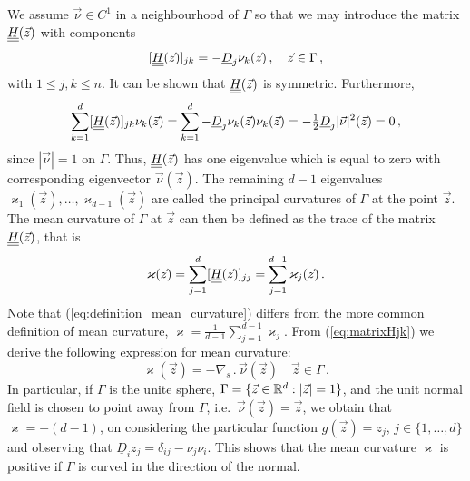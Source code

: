 We assume $\vec{\nu} \in C^1$ in a neighbourhood of $\Gamma$ so that we
may introduce the matrix $\mat H(\vec z)$ with components
\begin{equation}\label{eq:matrixHjk}
[\mat H (\vec z)]_{jk} = - \underline{D}_j \nu_k (\vec z)\,, \quad \vec z \in
\Gamma \, ,
\end{equation}
with $1\leq j,k\leq n$. It can be shown that $\mat H(\vec z)$ is symmetric.
Furthermore,
\begin{equation}
\sum_{k = 1}^{d} [\mat H(\vec z)]_{jk} \nu_k (\vec z) =
\sum_{k = 1}^{d} - \underline{D}_j \nu_k (\vec z) \nu_k (\vec z) =
- \tfrac{1}{2} \underline{D}_j |\vec{\nu}|^2 (\vec z) = 0 \, ,
\end{equation}
since $|\vec{\nu}| = 1$ on $\Gamma$. Thus, $\mat H(\vec z)$ has one
eigenvalue which is equal to zero with corresponding eigenvector
$\vec\nu(\vec z)$. The remaining $d - 1$ eigenvalues $\varkappa_1 (\vec z),
\hdots, \varkappa_{d - 1} (\vec z)$ are called the principal curvatures of
$\Gamma$ at the point $\vec z$. The mean curvature of $\Gamma$ at $\vec z$
can then be defined as the trace of the matrix $\mat H(\vec z)$, that is
\begin{equation}\label{eq:definition_mean_curvature}
\varkappa (\vec z) = \sum_{j = 1}^{d} [\mat H(\vec z)]_{jj} = \sum_{j = 1}^{d -
1} \varkappa_j (\vec z) \,.
\end{equation}
Note that (\ref{eq:definition_mean_curvature}) differs from the more common
definition of mean curvature,
$\varkappa = \frac{1}{d - 1} \sum_{j = 1}^{d - 1} \varkappa_j$.
From (\ref{eq:matrixHjk}) we derive the following expression for mean
curvature:
\begin{equation}
\varkappa (\vec z)=-\nabla_s \,.\, \vec{\nu}(\vec z) \quad \vec z \in \Gamma\,.
\end{equation}
In particular, if $\Gamma$ is the unite sphere,
$\Gamma = \{ \vec z \in {\mathbb R}^d : |\vec z| = 1 \}$,
and the unit normal field is chosen to point away from $\Gamma$,
i.e.~$\vec\nu(\vec z) = \vec z$, we obtain that $\varkappa = -
(d - 1)$, on considering the particular function $g(\vec z) = z_j$, $j \in \{
1, \hdots, d \}$ and observing that $\underline{D}_i z_j = \delta_{ij} - \nu_j
\nu_i$. This shows that the mean curvature $\varkappa$ is positive if $\Gamma$
is curved in the direction of the normal.

